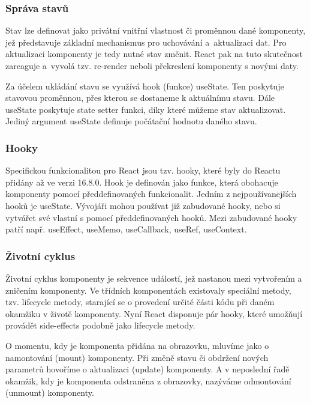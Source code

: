 \subsubsection{Správa stavů}

Stav lze definovat jako privátní vnitřní vlastnost či proměnnou dané komponenty, jež představuje základní mechanismus pro uchovávání a~aktualizaci dat. 
Pro aktualizaci komponenty je tedy nutné stav změnit. React pak na tuto skutečnost zareaguje a~vyvolá tzv. re-render neboli překreslení komponenty s novými daty.

Za účelem ukládání stavu se využívá hook (funkce) useState. Ten poskytuje stavovou proměnnou, přes kterou se dostaneme k aktuálnímu stavu. 
Dále useState poskytuje state setter funkci, díky které můžeme stav aktualizovat. Jediný argument useState definuje počátační hodnotu daného stavu.\cite{reactitnetwork,react}

\subsubsection{Hooky}

Specifickou funkcionalitou pro React jsou tzv. hooky, které byly do Reactu přidány až ve verzi 16.8.0.\cite{reactgithub} 
Hook je definován jako funkce, která obohacuje komponenty pomocí předdefinovaných funkcionalit. Jedním z nejpoužívanejších hooků je useState. 
Vývojáři mohou používat již zabudované hooky, nebo si vytvářet své vlastní s pomocí předdefinovaných hooků. 
Mezi zabudované hooky patří např. useEffect, useMemo, useCallback, useRef, useContext.\cite{react}

\subsubsection{Životní cyklus}

Životní cyklus komponenty je sekvence událostí, jež nastanou mezi vytvořením a zničením komponenty. 
Ve třídních komponentách existovaly speciální metody, tzv. lifecycle metody, starající se o provedení určité části kódu při daném okamžiku v životě komponenty. 
Nyní React disponuje pár hooky, které umožňují provádět side-effects podobně jako lifecycle metody.

O momentu, kdy je komponenta přidána na obrazovku, mluvíme jako o namontování (mount) komponenty. Při změně stavu či obdržení nových parametrů hovoříme o aktualizaci (update) komponenty. 
A v neposlední řadě okamžik, kdy je komponenta odstraněna z obrazovky, nazýváme odmontování (unmount) komponenty.\cite{reactlifecycle, react}

